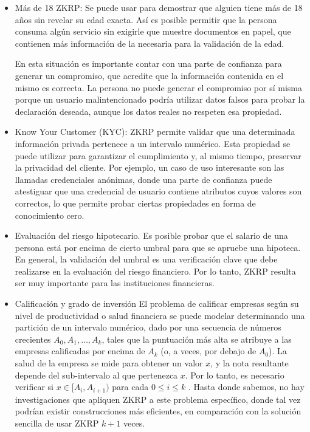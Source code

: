 \begin{itemize}
    \item Más de 18 ZKRP: Se puede usar para demostrar que alguien tiene más de 18 años sin revelar su edad exacta. Así es posible permitir que la persona consuma algún servicio sin exigirle que muestre documentos en papel, que contienen más información de la necesaria para la validación de la edad.

    En esta situación es importante contar con una parte de confianza para generar un compromiso, que acredite que la información contenida en el mismo es correcta. La persona no puede generar el compromiso por sí misma porque un usuario malintencionado podría utilizar datos falsos para probar la declaración deseada, aunque los datos reales no respeten esa propiedad.
    
    \item Know Your Customer (KYC): ZKRP permite validar que una determinada información privada pertenece a un intervalo numérico. Esta propiedad se puede utilizar para garantizar el cumplimiento y, al mismo tiempo, preservar la privacidad del cliente. Por ejemplo, un caso de uso interesante son las llamadas credenciales anónimas, donde una parte de confianza puede atestiguar que una credencial de usuario contiene atributos cuyos valores son correctos, lo que permite probar ciertas propiedades en forma de conocimiento cero.
    
    \item Evaluación del riesgo hipotecario. Es posible probar que el salario de una persona está por encima de cierto umbral para que se apruebe una hipoteca. En general, la validación del umbral es una verificación clave que debe realizarse en la evaluación del riesgo financiero. Por lo tanto, ZKRP resulta ser muy importante para las instituciones financieras.
    
    \item Calificación y grado de inversión El problema de calificar empresas según su nivel de productividad o salud financiera se puede modelar determinando una partición de un intervalo numérico, dado por una secuencia de números crecientes $A_{0}, A_{1}, \dots, A_{k}$, tales que la puntuación más alta se atribuye a las empresas calificadas por encima de $A_{k}$ (o, a veces, por debajo de $A_{0}$). La salud de la empresa se mide para obtener un valor $x$, y la nota resultante depende del sub-intervalo al que pertenezca $x$. Por lo tanto, es necesario verificar si $x \in [A_{i}, A_{i+1})$ para cada $0 \leq i \leq k$ . Hasta donde sabemos, no hay investigaciones que apliquen ZKRP a este problema específico, donde tal vez podrían existir construcciones más eficientes, en comparación con la solución sencilla de usar ZKRP $k + 1$ veces.
    

\end{itemize}
